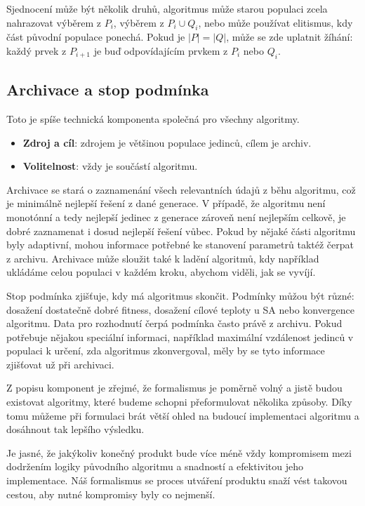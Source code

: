 Sjednocení může být několik druhů, algoritmus může starou populaci zcela nahrazovat výběrem z $P_i$, výběrem z $P_i \cup Q_i$, nebo může používat elitismus, kdy část původní populace ponechá. Pokud je $|P| = |Q|$, může se zde uplatnit žíhání: každý prvek z $P_{i+1}$ je buď odpovídajícím prvkem z $P_i$ nebo $Q_i$.

\subsection{Archivace a stop podmínka}

Toto je spíše technická komponenta společná pro všechny algoritmy.
\begin{itemize}
  \item \textbf{Zdroj a cíl}: zdrojem je většinou populace jedinců, cílem je archiv.
  \item \textbf{Volitelnost}: vždy je součástí algoritmu.
\end{itemize}

Archivace se stará o zaznamenání všech relevantních údajů z běhu algoritmu, což je minimálně nejlepší řešení z dané generace. V případě, že algoritmu není monotónní a tedy nejlepší jedinec z generace zároveň není nejlepším celkově, je dobré zaznamenat i dosud nejlepší řešení vůbec. Pokud by nějaké části algoritmu byly adaptivní, mohou informace potřebné ke stanovení parametrů taktéž čerpat z archivu. Archivace může sloužit také k ladění algoritmů, kdy například ukládáme celou populaci v každém kroku, abychom viděli, jak se vyvíjí.

Stop podmínka zjišťuje, kdy má algoritmus skončit. Podmínky můžou být různé: dosažení dostatečně dobré fitness, dosažení cílové teploty u SA nebo konvergence algoritmu. Data pro rozhodnutí čerpá podmínka často právě z archivu. Pokud potřebuje nějakou speciální informaci, například maximální vzdálenost jedinců v populaci k určení, zda algoritmus zkonvergoval, měly by se tyto informace zjišťovat už při archivaci.

\vspace{1cm}
Z popisu komponent je zřejmé, že formalismus je poměrně volný a jistě budou existovat algoritmy, které budeme schopni přeformulovat několika způsoby. Díky tomu můžeme při formulaci brát větší ohled na budoucí implementaci algoritmu a dosáhnout tak lepšího výsledku.

Je jasné, že jakýkoliv konečný produkt bude více méně vždy kompromisem mezi dodržením logiky původního algoritmu a snadností a efektivitou jeho implementace. Náš formalismus se proces utváření produktu snaží vést takovou cestou, aby nutné kompromisy byly co nejmenší.
